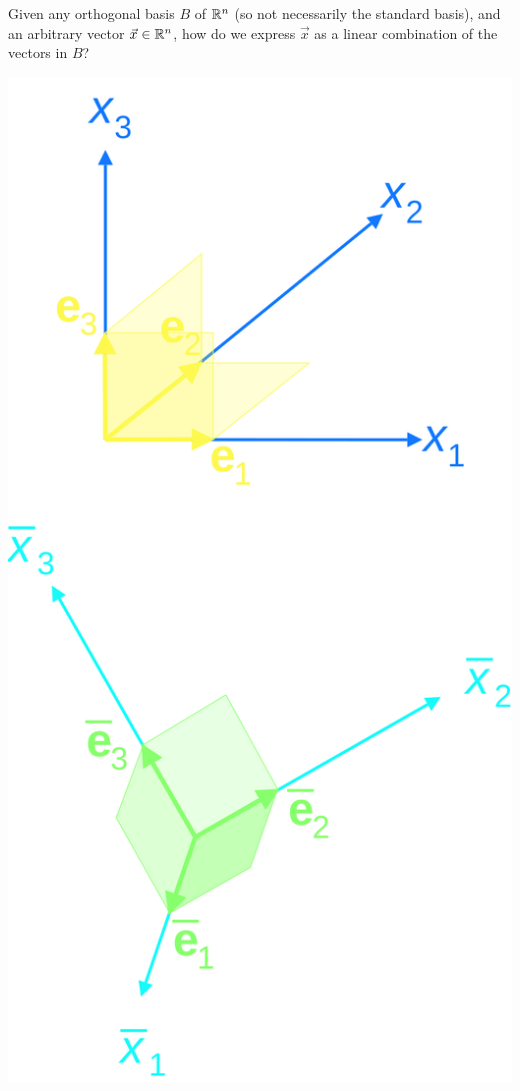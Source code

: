 \documentclass[pdf,9pt]{beamer}
\begin{document}
\begin{frame}[fragile]
\begin{problem}
    Given any orthogonal basis $B$ of $\mathbb{R}^n$ (so not necessarily
    the standard basis), and an arbitrary vector $\vec{x}\in\mathbb{R}^n$,
    how do we express $\vec{x}$ as a linear combination of the
    vectors in $B$?
\end{problem}
\vfill
\begin{center}
   \includegraphics[scale=0.1]{./figures/Rectangular_coordinate_systems_index_lowered.png}
\end{center}
\end{frame}
\end{document}

